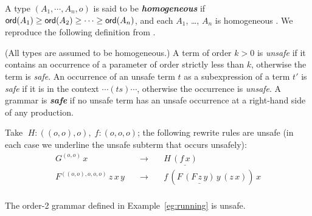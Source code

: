 \documentclass{llncs}
\newcommand\defname[1]{{\bf\em #1}\index{#1}}
\newcommand\ord[1]{{\sf
    ord}(#1)} \newcommand\typear{\rightarrow}
\begin{document}
A type $(A_1, \cdots, A_n, o)$ is said to be \defname{homogeneous} if
$\ord{A_1} \geq \ord{A_2}\geq \cdots \geq \ord{A_n}$, and each $A_1$,
\ldots, $A_n$ is homogeneous \cite{KNU02}.  We reproduce the following
definition from \cite{KNU02}.

\begin{definition}\rm
  (All types are assumed to be homogeneous.) A term of order $k > 0$
  is \emph{unsafe} if it contains an occurrence of a parameter of
  order strictly less than $k$, otherwise the term is \emph{safe}. An
  occurrence of an unsafe term $t$ as a subexpression of a term $t'$
  is \emph{safe} if it is in the context $\cdots (ts) \cdots$,
  otherwise the occurrence is \emph{unsafe}. A grammar is
  \defname{safe} if no unsafe term has an unsafe occurrence at a
  right-hand side of any production.
\end{definition}

\begin{example}\begin{inparaenum}[(i)] \item Take $\; H : ((o, o), o), \; f : (o, o, o)$; the
    following rewrite rules are unsafe (in each case we underline the
    unsafe subterm that occurs unsafely):
\[\begin{array}{rll}
G^{(o, o)} \, x & \quad \rightarrow \quad & H \, \underline{(f \, {x})} \\
F^{((o, o), o, o, o)} \, z \, x \, y & \quad \rightarrow \quad & f \, (F \, \underline{(F \, z
\, {y})} \, y \, (z \, x) ) \, x \\
\end{array}\]
\item The order-2 grammar defined in Example~\ref{eg:running} is
  unsafe.
\end{inparaenum}
\end{example}
\end{document}

